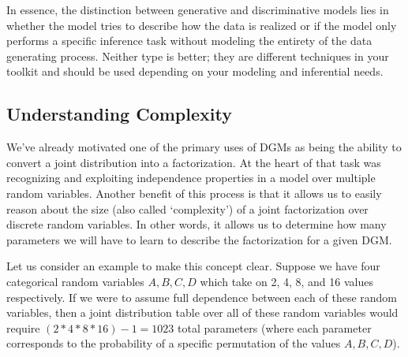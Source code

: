 In essence, the distinction between generative and discriminative models lies in whether the model tries to describe how the data is realized or if the model only performs a specific inference task without modeling the entirety of the data generating process. Neither type is better; they are different techniques in your toolkit and should be used depending on your modeling and inferential needs.

\subsection{Understanding Complexity}
We've already motivated one of the primary uses of DGMs as being the ability to convert a joint distribution into a factorization. At the heart of that task was recognizing and exploiting independence properties in a model over multiple random variables. Another benefit of this process is that it allows us to easily reason about the size (also called `complexity') of a joint factorization over discrete random variables. In other words, it allows us to determine how many parameters we will have to learn to describe the factorization for a given DGM.

Let us consider an example to make this concept clear. Suppose we have four categorical random variables $A, B, C, D$ which take on 2, 4, 8, and 16 values respectively. If we were to assume full dependence between each of these random variables, then a joint distribution table over all of these random variables would require $(2 * 4 * 8 * 16) - 1=1023$ total parameters (where each parameter corresponds to the probability of a specific permutation of the values $A, B, C, D$).



